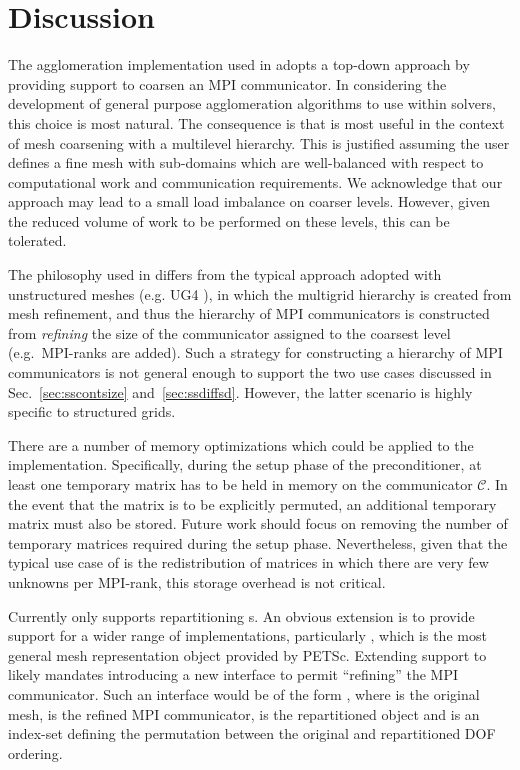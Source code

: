 \documentclass[]{siamart0216}
\begin{document}
\section{Discussion}
The agglomeration implementation used in  adopts a top-down approach by 
providing support to coarsen an MPI communicator. 
In considering the development of general purpose agglomeration algorithms to use within solvers, 
this choice is most natural. The consequence is that  is most useful in the context 
of mesh coarsening with a multilevel hierarchy. This is justified assuming the user defines a fine mesh 
with sub-domains which are well-balanced with respect to computational work and communication requirements. 
We acknowledge that our approach may lead to a small load imbalance on coarser levels. 
However, given the reduced volume of 
work to be performed on these levels, this can be tolerated. 

The philosophy used in  differs from the typical approach adopted with unstructured meshes (e.g. UG4 \cite{reiter2013massively}), in which 
the multigrid hierarchy is created from mesh refinement, and thus the hierarchy of MPI 
communicators is constructed from \textit{refining} the size of the communicator assigned to the 
coarsest level (e.g.~MPI-ranks are added).
Such a strategy for constructing a hierarchy of MPI communicators is not general enough
to support the two use cases discussed in Sec.~\ref{sec:sscontsize} and~\ref{sec:ssdiffsd}. 
However, the latter scenario is highly specific to structured grids.

There are a number of memory optimizations which could be applied to the  implementation. 
Specifically, during the setup phase of the preconditioner, at least one temporary matrix has to be held in memory on the communicator $\mathcal C$.
In the event that the matrix is to be explicitly permuted, an additional temporary matrix must also be stored.
Future work should focus on removing the number of temporary matrices required during the setup phase.
Nevertheless, given that the typical use case of  is the redistribution of matrices in which there are very few unknowns per MPI-rank, this storage overhead is not critical.

Currently  only supports repartitioning s. 
An obvious extension is to provide support for a wider range of  implementations, 
particularly , which is the most general mesh representation object provided by PETSc. 
Extending support to  likely mandates introducing a new  interface to permit ``refining'' the MPI communicator. Such an interface would be of the form , where  is the original mesh,  is the refined MPI communicator,  is the repartitioned  object and  is an index-set defining the permutation between the original and repartitioned DOF ordering.
\end{document}
